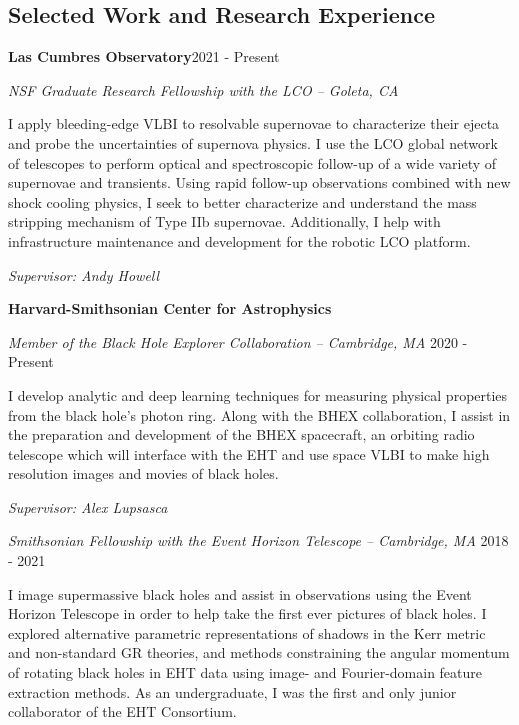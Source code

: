 \documentclass[margin,line]{res}
\begin{document}
\begin{resume}
\vspace{+.4cm}
\section{\sc Selected Work and Research Experience}
{\bf Las Cumbres Observatory}\hfill 2021 - Present


\vspace{-.4cm}
{\em NSF Graduate Research Fellowship with the LCO -- Goleta, CA}

\begin{changemargin}{-0.0cm}{2.5cm} 
I apply bleeding-edge VLBI to resolvable supernovae to characterize their ejecta and probe the uncertainties of supernova physics. I use the LCO global network of telescopes to perform optical and spectroscopic follow-up of a wide variety of supernovae and transients. Using rapid follow-up observations combined with new shock cooling physics, I seek to better characterize and understand the mass stripping mechanism of Type IIb supernovae. Additionally, I help with infrastructure maintenance and development for the robotic LCO platform.

\textit{Supervisor: Andy Howell}
\end{changemargin}



{\bf Harvard-Smithsonian Center for Astrophysics}

\vspace{-.4cm}
{\em Member of the Black Hole Explorer Collaboration -- Cambridge, MA} \hfill 2020 - Present

\begin{changemargin}{-0.0cm}{2.5cm} 
I develop analytic and deep learning techniques for measuring physical properties from the black hole's photon ring. Along with the BHEX collaboration, I assist in the preparation and development of the BHEX spacecraft, an orbiting radio telescope which will interface with the EHT and use space VLBI to make high resolution images and movies of black holes.

\textit{Supervisor: Alex Lupsasca}
\end{changemargin}


{\em Smithsonian Fellowship with the Event Horizon Telescope -- Cambridge, MA} \hfill 2018 - 2021

\begin{changemargin}{-0.0cm}{2.5cm} 
I image supermassive black holes and assist in observations using the Event Horizon Telescope in order to help take the first ever pictures of black holes. I explored alternative parametric representations of shadows in the Kerr metric and non-standard GR theories, and methods constraining the angular momentum of rotating black holes in EHT data using image- and Fourier-domain feature extraction methods. As an undergraduate, I was the first and only junior collaborator of the EHT Consortium. 


\end{changemargin}
\end{resume}
\end{document}
